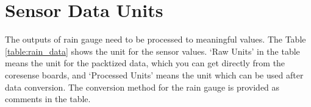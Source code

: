 \section{Sensor Data Units}\label{section:parameterUnits}

The outputs of rain gauge need to be processed to meaningful values.
The Table \ref{table:rain_data} shows the unit for the sensor values.
`Raw Units' in the table means the unit for the packtized data, which you can get directly from the coresense boards, 
and `Processed Units' means the unit which can be used after data conversion.
The conversion method for the rain gauge is provided as comments in the table.
\\


\begin{table}[H]
    \caption{Sub-packet for rain gauge}
    \label{table:rain_data}
\end{table}



